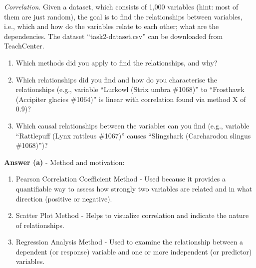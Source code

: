 \documentclass[a4paper,10pt]{article}\setlength{\textheight}{10in}\setlength{\textwidth}{6.5in}\setlength{\topmargin}{-0.125in}\setlength{\oddsidemargin}{-.2in}\setlength{\evensidemargin}{-.2in}\setlength{\headsep}{0.2in}\setlength{\footskip}{0pt}\usepackage{amsmath}\usepackage{fancyhdr}\usepackage{enumitem}\usepackage{hyperref}\usepackage{xcolor}\usepackage{graphicx}\usepackage[export]{adjustbox}\usepackage{caption}\usepackage{float}\usepackage{booktabs}\usepackage{makecell}\pagestyle{fancy}
\begin{document}
\begin{enumerate}[topsep=0mm, partopsep=0mm, leftmargin=*]
\clearpage
{\color{blue}
\newpage\item\textit{Correlation}. Given a dataset, which consists of 1,000 variables (hint: most of them are just random), the goal is to find the relationships between variables, i.e., which and how do the variables relate to each other; what are the dependencies.
The dataset ``task2-dataset.csv'' can be downloaded from TeachCenter.
\begin{enumerate}
	\item Which methods did you apply to find the relationships, and why?
	\item Which relationships did you find and how do you characterise the relationships (e.g., variable ``Lurkowl (Strix umbra \#1068)'' to ``Frosthawk (Accipiter glacies \#1064)'' is linear with correlation found via method X of 0.9)?
	\item Which causal relationships between the variables can you find (e.g., variable ``Rattlepuff (Lynx rattleus \#1067)'' causes ``Slingshark (Carcharodon slingus \#1068)'')?
\end{enumerate}
}

\textbf{Answer (a)} - Method and motivation:
    \begin{enumerate}
        \item Pearson Correlation Coefficient Method - Used because it provides a quantifiable way to assess how strongly two variables are related and in what direction (positive or negative).
        \item Scatter Plot Method - Helps to visualize correlation and indicate the nature of relationships.
        \item Regression Analysis Method - Used to examine the relationship between a dependent (or response) variable and one or more independent (or predictor) variables.
    \end{enumerate}


\end{enumerate}
\end{document}
